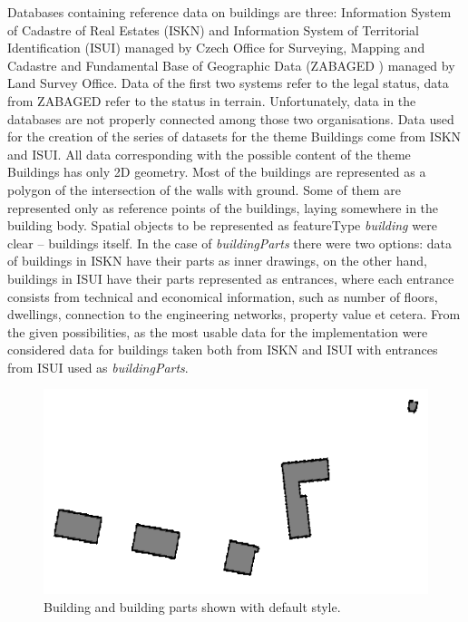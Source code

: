 \documentclass[eprint]{actapoly}
\begin{document}
Databases containing reference data on buildings are three: Information System of Cadastre of Real Estates (ISKN) and Information System of Territorial Identification (ISUI) managed by Czech Office for Surveying, Mapping and Cadastre and Fundamental Base of Geographic Data (ZABAGED \circledR) managed by Land Survey Office. Data of the first two systems refer to the legal status, data from ZABAGED refer to the status in terrain. Unfortunately, data in the databases are not properly connected among those two organisations. Data used for the creation of the series of datasets for the theme Buildings come from ISKN and ISUI. All data corresponding with the possible content of the theme Buildings has only 2D geometry. Most of the buildings are represented as a polygon of the intersection of the walls with ground. Some of them are represented only as reference points of the buildings, laying somewhere in the building body. Spatial objects to be represented as featureType \textit{building} were clear -- buildings itself. In the case of \textit{buildingParts} there were two options: data of buildings in ISKN have their parts as inner drawings, on the other hand, buildings in ISUI have their parts represented as entrances, where each entrance consists from technical and economical information, such as number of floors, dwellings, connection to the engineering networks, property value et cetera. From the given possibilities, as the most usable data for the implementation were considered data for buildings taken both from ISKN and ISUI with entrances from ISUI used as \textit{buildingParts}.

\begin{figure}
\centering
\includegraphics[width=0.8\linewidth]{pics/bu_wms.png} %
\caption{Building and building parts shown with default style.}
\label{fig:bu_portrayal}
\end{figure}
\end{document}
